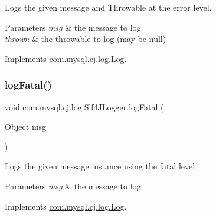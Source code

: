 Logs the given message and Throwable at the \textquotesingle{}error\textquotesingle{} level.


\begin{DoxyParams}{Parameters}
{\em msg} & the message to log \\
\hline
{\em thrown} & the throwable to log (may be null) \\
\hline
\end{DoxyParams}


Implements \mbox{\hyperlink{interfacecom_1_1mysql_1_1cj_1_1log_1_1_log_a96aab6e63a2ab9ebe3b640b7e253dd4f}{com.\+mysql.\+cj.\+log.\+Log}}.

\mbox{\label{classcom_1_1mysql_1_1cj_1_1log_1_1_slf4_j_logger_a60d9438bd9dfae5451a25543e2d4584a}} 
\subsubsection{\texorpdfstring{log\+Fatal()}{logFatal()}\hspace{0.1cm}{\footnotesize\ttfamily [1/2]}}
{\footnotesize\ttfamily void com.\+mysql.\+cj.\+log.\+Slf4\+J\+Logger.\+log\+Fatal (\begin{DoxyParamCaption}\item[{Object}]{msg }\end{DoxyParamCaption})}

Logs the given message instance using the \textquotesingle{}fatal\textquotesingle{} level


\begin{DoxyParams}{Parameters}
{\em msg} & the message to log \\
\hline
\end{DoxyParams}


Implements \mbox{\hyperlink{interfacecom_1_1mysql_1_1cj_1_1log_1_1_log_a4f36fdcde6b1c88a4f1ba25a70555e3f}{com.\+mysql.\+cj.\+log.\+Log}}.

\mbox{\label{classcom_1_1mysql_1_1cj_1_1log_1_1_slf4_j_logger_ac61e11ed170d64dec00903990ac86778}} 
